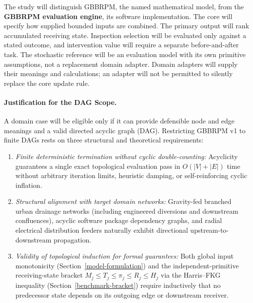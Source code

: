 The study will distinguish GBBRPM, the named mathematical model, from the
\textbf{GBBRPM evaluation engine}, its software implementation. The core
will specify how supplied bounded inputs are combined. The primary output
will rank accumulated receiving state. Inspection selection will be evaluated
only against a stated outcome, and intervention value will require a separate
before-and-after task. The stochastic reference will be an evaluation model
with its own primitive assumptions, not a replacement domain adapter. Domain adapters will
supply their meanings and calculations; an adapter will not be permitted
to silently replace the core update rule.

\paragraph{Justification for the DAG Scope.}
A domain case will be eligible only if it can provide defensible node and
edge meanings and a valid directed acyclic graph (DAG). Restricting GBBRPM v1
to finite DAGs rests on three structural and theoretical requirements:
\begin{enumerate}[label=(\roman*),leftmargin=*]
\item \textit{Finite deterministic termination without cyclic double-counting:}
Acyclicity guarantees a single exact topological evaluation pass in
$O(|V|+|E|)$ time without arbitrary iteration limits, heuristic damping, or
self-reinforcing cyclic inflation.
\item \textit{Structural alignment with target domain networks:} Gravity-fed
branched urban drainage networks (including engineered diversions and
downstream confluences), acyclic software package dependency graphs, and
radial electrical distribution feeders naturally exhibit directional
upstream-to-downstream propagation.
\item \textit{Validity of topological induction for formal guarantees:} Both
global input monotonicity (Section~\ref{model-formulation}) and the
independent-primitive receiving-state bracket
$M_j\le T_j\le\pi_j\le R_j\le H_j$ via the Harris--FKG inequality
(Section~\ref{benchmark-bracket}) require inductively that no predecessor
state depends on its outgoing edge or downstream receiver.
\end{enumerate}

